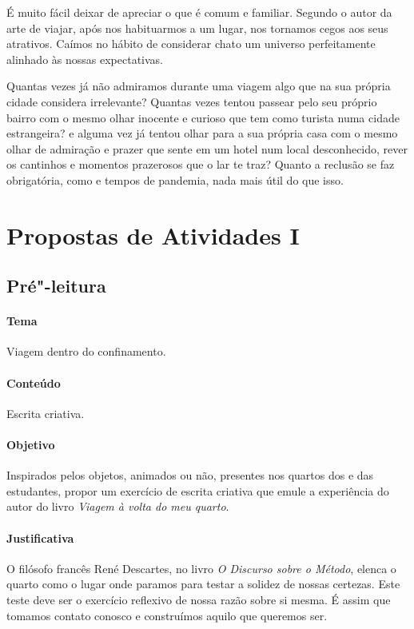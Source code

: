 \documentclass[12pt]{extarticle}
\begin{document}
É muito fácil deixar de apreciar o que é comum e familiar. Segundo o autor da arte de viajar, após nos habituarmos a um lugar, nos tornamos cegos aos seus atrativos. Caímos no hábito de considerar chato um universo perfeitamente alinhado às nossas expectativas.

Quantas vezes já não admiramos durante uma viagem algo que na sua própria cidade considera irrelevante? Quantas vezes tentou passear pelo seu próprio bairro com o mesmo olhar inocente e curioso que tem como turista numa cidade estrangeira? e alguma vez já tentou olhar para a sua própria casa com o mesmo olhar de admiração e prazer que sente em um hotel num local desconhecido, rever os cantinhos e momentos prazerosos que o lar te traz? Quanto a reclusão se faz obrigatória, como e tempos de pandemia, nada mais útil do que isso. 



\section{Propostas de Atividades I}


\subsection{Pré"-leitura}


\paragraph{Tema} Viagem dentro do confinamento. 

\paragraph{Conteúdo} Escrita criativa. 

\paragraph{Objetivo} Inspirados pelos objetos, animados ou não, 
presentes nos quartos dos e das estudantes, propor um exercício 
de escrita criativa que emule a experiência do autor do livro
\textit{Viagem à volta do meu quarto}.

\paragraph{Justificativa}
O filósofo francês René Descartes, no livro \textit{O Discurso sobre o Método}, 
elenca o quarto como o lugar onde paramos para testar a solidez de nossas certezas. 
Este teste deve ser o exercício reflexivo de nossa razão sobre si mesma. É assim
que tomamos contato conosco e construímos aquilo que queremos ser. 
\end{document}
